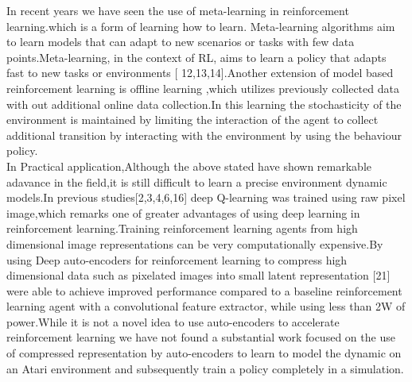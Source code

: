 In recent years we have seen the use of meta-learning in reinforcement learning.which is a form of learning how to learn. Meta-learning algorithms aim to learn models that can adapt to new scenarios or tasks with few data
points.Meta-learning, in the context of RL, aims to learn a policy that adapts fast to new tasks or environments [ 12,13,14].Another extension of model based reinforcement learning is offline learning ,which utilizes  previously collected data with out additional online data collection.In this learning the stochasticity of the environment is maintained by limiting the interaction of the agent  to collect additional transition by interacting with the environment by using the behaviour policy.\\

In Practical application,Although the above stated have shown remarkable adavance in the field,it is still difficult to learn a precise environment dynamic models.In previous studies[2,3,4,6,16] deep Q-learning was trained using raw pixel image,which remarks one of greater advantages of using deep learning in reinforcement learning.Training reinforcement learning agents from high dimensional image representations can be very computationally expensive.By using  Deep auto-encoders for reinforcement learning to compress high dimensional data such as pixelated images into small  latent representation [21]  were able to achieve improved performance compared to a baseline reinforcement learning  agent with a convolutional feature extractor, while using less than 2W of power.While it is not a novel idea to use auto-encoders to accelerate reinforcement learning we have not found a substantial work focused  on the use of compressed representation by auto-encoders to learn to model the dynamic on an Atari  environment and subsequently train a policy completely in a simulation.



